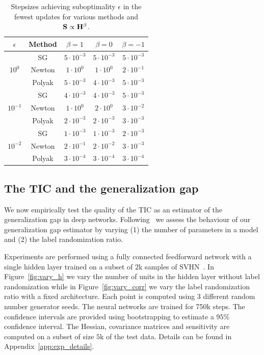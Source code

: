 \begin{table}
\centering
\begin{tabular}{|c|c||c|c|c|}
\hline
$\epsilon$&\textbf{Method} &   $\beta=1$ &   $\beta=0$ &   $\beta=-1$\\
\hline
\multirow{3}{*}{$10^0$}&SG              &   $5\cdot 10^{-3}$ &   $5\cdot 10^{-3}$ &   $5\cdot 10^{-3}$\\
&Newton                                 &   $1\cdot 10^{0}$  &   $1\cdot 10^0$   &   $2\cdot 10^{-1}$\\
&Polyak                                 &   $5\cdot 10^{-3}$  &   $4\cdot 10^{-3}$  &   $5\cdot 10^{-3}$\\
\hline
\multirow{3}{*}{$10^{-1}$}&SG   &   $4\cdot 10^{-3}$     &   $4\cdot 10^{-3}$ &   $5\cdot 10^{-3}$\\
&Newton                         &   $1\cdot 10^0$       &   $2\cdot 10^0$  & $3\cdot 10^{-2}$\\
&Polyak                         &   $2\cdot 10^{-3}$     &   $2\cdot 10^{-3}$ &   $3\cdot 10^{-3}$\\
\hline
\multirow{3}{*}{$10^{-2}$}&SG   &   $1\cdot 10^{-3}$    &   $1\cdot 10^{-3}$    &   $2\cdot 10^{-3}$\\
&Newton                         &   $2\cdot 10^{-1}$      &   $2\cdot 10^{-2}$     &   $3\cdot 10^{-3}$\\
&Polyak                         &   $3\cdot 10^{-4}$    &   $3\cdot 10^{-4}$    &   $3\cdot 10^{-4}$\\
\hline
\end{tabular}
\caption{Stepsizes achieving suboptimality $\epsilon$ in the fewest updates for various methods and ${\mathbf{S}} \propto {\mathbf{H}}^\beta$.
\label{tab:stepsize_noise}}
\end{table}



\subsection{The TIC and the generalization gap}
\label{sec:neyshabur_gen}
We now empirically test the quality of the TIC as an estimator of the generalization gap in deep networks.
Following~\citet{neyshabur2017exploring} we assess the behaviour of our generalization gap estimator by varying (1) the number of parameters in a model and (2) the label randomization ratio.

Experiments are performed using a fully connected feedforward network with a single hidden layer trained on a subset of $2$k samples of SVHN~\citep{netzer2011reading}. In Figure~\ref{fig:vary_h} we vary the number of units in the hidden layer without label randomization while in Figure~\ref{fig:vary_corr} we vary the label randomization ratio with a fixed architecture.
Each point is computed using 3 different random number generator seeds. The neural networks are trained for 750k steps. The confidence intervals are provided using bootstrapping to estimate a $95 \%$ confidence interval. The Hessian, covariance matrices and sensitivity are computed on a subset of size $5$k of the test data. Details can be found in Appendix~\ref{app:exp_details}.


